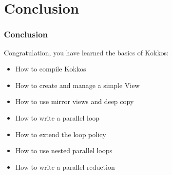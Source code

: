 \documentclass[aspectratio=169]{beamer}
\begin{document}

\section[Conclusion]{Conclusion}


\begin{frame}[fragile]
    \frametitle{Conclusion}

Congratulation, you have learned the basics of Kokkos:

\begin{itemize}
    \item How to compile Kokkos
    \item How to create and manage a simple View
    \item How to use mirror views and deep copy
    \item How to write a parallel loop
    \item How to extend the loop policy
    \item How to use nested parallel loops
    \item How to write a parallel reduction
\end{itemize}

\end{frame}
\end{document}
